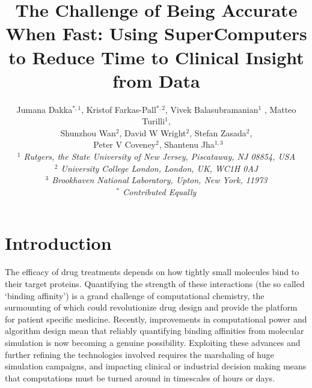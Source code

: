 \documentclass[conference]{IEEEtran}
\begin{document}


\title{The Challenge of Being Accurate When Fast: Using SuperComputers to Reduce Time to Clinical Insight from Data}



\author{Jumana Dakka$^{*,1}$, Kristof Farkas-Pall$^{*,2}$, Vivek Balasubramanian$^{1}$ , Matteo Turilli$^{1}$, \\ 
 Shunzhou Wan$^{2}$, David W Wright$^{2}$, Stefan Zasada$^{2}$, \\\
 Peter V Coveney$^{2}$, Shantenu Jha$^{1,3}$ \\

  \small{\emph{$^{1}$ Rutgers, the State University of New Jersey, Piscataway, NJ 08854, USA}}\\
   \small{\emph{$^{2}$ University College London, London, UK, WC1H 0AJ}}\\
   \small{\emph{$^{3}$ Brookhaven National Laboratory, Upton, New York, 11973}}\\
   \small{\emph{$^{*}$ Contributed Equally}}
}


\date{}
\maketitle

\begin{abstract} 

\end{abstract}


\section{Introduction}\label{sec:intro}

The efficacy of drug treatments depends on how tightly small molecules bind to their target proteins. Quantifying the strength of these interactions (the so called ‘binding affinity’) is a grand challenge of computational chemistry, the surmounting of which could revolutionize drug design and provide the platform for patient specific medicine. Recently, improvements in computational power and algorithm design mean that reliably quantifying binding affinities from molecular simulation is now becoming a genuine possibility. Exploiting these advances and further refining the technologies involved requires the marshaling of huge simulation campaigns, and impacting clinical or industrial decision making means that computations must be turned around in timescales of hours or days. 
\end{document}

